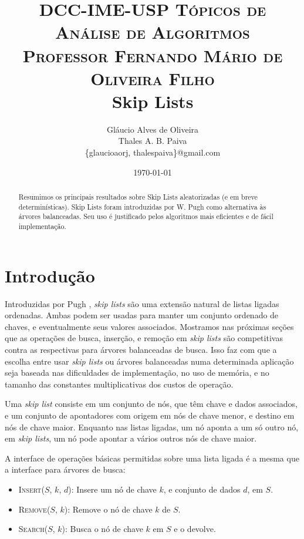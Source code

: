 \documentclass[paper=a4, fontsize=11pt]{scrartcl} %
\title{ 
\normalfont \small 
\textsc{DCC-IME-USP Tópicos de Análise de Algoritmos \\ Professor Fernando Mário de Oliveira Filho} \\ [25pt]
\huge Skip Lists%
}
\author{Gláucio Alves de Oliveira \\ Thales A. B. Paiva 
        \\ \scriptsize \{glaucioaorj, thalespaiva\}@gmail.com}
\date{\normalsize\today}
\numberwithin{equation}{section}
\numberwithin{figure}{section}
\numberwithin{table}{section}
\numberwithin{definition}{section}
\numberwithin{theorem}{section}
\numberwithin{property}{section}
\numberwithin{proposition}{section}
\newcommand{\horrule}[1]{\rule{\linewidth}{#1}} %
\newcommand{\sls}{\textit{skip lists}\xspace}
\newcommand{\skl}{\textit{skip list}\xspace}
\renewcommand{\sl}{\textit{skip list}\xspace}
\begin{document}
\maketitle %

\begin{abstract} \noindent

Resumimos os principais resultados sobre Skip Lists aleatorizadas (e em breve determinísticas). 
Skip Lists foram introduzidas por W. Pugh como alternativa às árvores balanceadas. 
Seu uso é justificado pelos algoritmos mais eficientes e de fácil implementação.

\end{abstract}

\tableofcontents


\section{Introdução}

Introduzidas por Pugh \cite{pugh1990skip}, \sls são uma extensão natural de listas ligadas ordenadas. 
Ambas podem ser usadas para manter um conjunto ordenado de chaves, e eventualmente seus valores associados.
Mostramos nas próximas seções que as operações de busca, inserção, e remoção em \sls são competitivas 
contra as respectivas para árvores balanceadas de busca.
Isso faz com que a escolha entre usar \sls ou árvores balanceadas numa
determinada aplicação seja baseada nas dificuldades de implementação, no uso de memória, e no tamanho das 
constantes multiplicativas dos custos de operação. 

Uma \sl consiste em um conjunto de nós, que têm chave e dados associados, e um conjunto de apontadores 
com origem em nós de chave menor, e destino em nós de chave maior.
Enquanto nas listas ligadas, um nó aponta a um só outro nó, em \sls, um nó pode apontar a vários 
outros nós de chave maior. 

A interface de operações básicas permitidas sobre uma lista ligada é a mesma que a interface
para árvores de busca:

\begin{itemize}
  \item \textsc{Insert}($S$, $k$, $d$): Insere um nó de chave $k$, e conjunto de dados
                                                 $d$, em $S$.
  \item \textsc{Remove}($S$, $k$): Remove o nó de chave $k$ de $S$.
  \item \textsc{Search}($S$, $k$): Busca o nó de chave $k$ em $S$ e o devolve.
\end{itemize}
\end{document}
